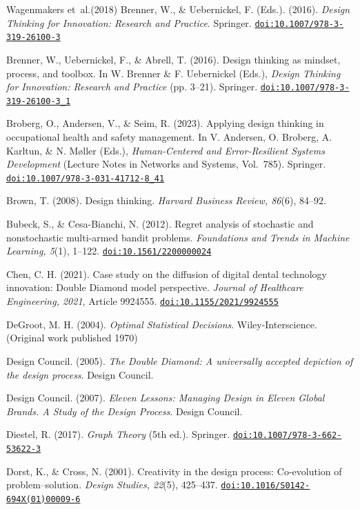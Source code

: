 \documentclass[11pt]{article}
\providecommand{\doi}[1]{\href{https://doi.org/#1}{\nolinkurl{doi:#1}}}
\begin{document}
\begin{thebibliography}{Wagenmakers et~al.(2018)}
 Brenner, W., \& Uebernickel, F. (Eds.). (2016). \textit{Design Thinking for Innovation: Research and Practice}. Springer. \doi{10.1007/978-3-319-26100-3}

 Brenner, W., Uebernickel, F., \& Abrell, T. (2016). Design thinking as mindset, process, and toolbox. In W. Brenner \& F. Uebernickel (Eds.), \textit{Design Thinking for Innovation: Research and Practice} (pp. 3--21). Springer. \doi{10.1007/978-3-319-26100-3_1}

 Broberg, O., Andersen, V., \& Seim, R. (2023). Applying design thinking in occupational health and safety management. In V. Andersen, O. Broberg, A. Karltun, \& N. M{\o}ller (Eds.), \textit{Human-Centered and Error-Resilient Systems Development} (Lecture Notes in Networks and Systems, Vol.\ 785). Springer. \doi{10.1007/978-3-031-41712-8_41}

 Brown, T. (2008). Design thinking. \textit{Harvard Business Review, 86}(6), 84--92.

 Bubeck, S., \& Cesa-Bianchi, N. (2012). Regret analysis of stochastic and nonstochastic multi-armed bandit problems. \textit{Foundations and Trends in Machine Learning, 5}(1), 1--122. \doi{10.1561/2200000024}

 Chen, C. H. (2021). Case study on the diffusion of digital dental technology innovation: Double Diamond model perspective. \textit{Journal of Healthcare Engineering, 2021}, Article 9924555. \doi{10.1155/2021/9924555}

 DeGroot, M. H. (2004). \textit{Optimal Statistical Decisions}. Wiley-Interscience. (Original work published 1970)

 Design Council. (2005). \textit{The Double Diamond: A universally accepted depiction of the design process}. Design Council.

 Design Council. (2007). \textit{Eleven Lessons: Managing Design in Eleven Global Brands. A Study of the Design Process}. Design Council.

 Diestel, R. (2017). \textit{Graph Theory} (5th ed.). Springer. \doi{10.1007/978-3-662-53622-3}

 Dorst, K., \& Cross, N. (2001). Creativity in the design process: Co-evolution of problem--solution. \textit{Design Studies, 22}(5), 425--437. \doi{10.1016/S0142-694X(01)00009-6}


\end{thebibliography}
\end{document}
